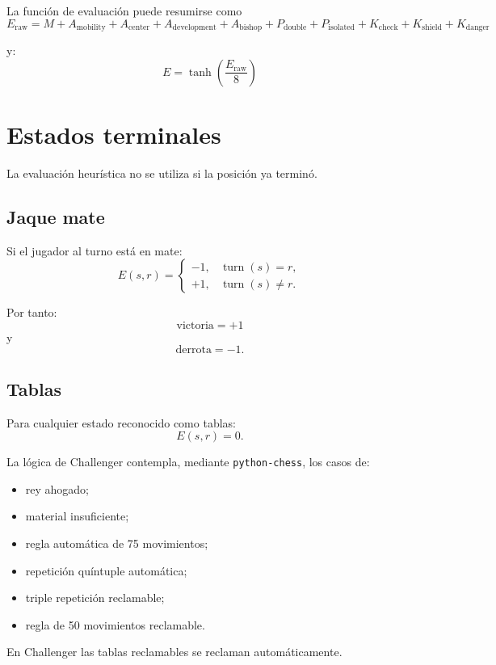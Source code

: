\documentclass[11pt,a4paper]{article}
\begin{document}
La función de evaluación puede resumirse como
\[
\boxed{
E_{\mathrm{raw}}
=
M
+
A_{\mathrm{mobility}}
+
A_{\mathrm{center}}
+
A_{\mathrm{development}}
+
A_{\mathrm{bishop}}
+
P_{\mathrm{double}}
+
P_{\mathrm{isolated}}
+
K_{\mathrm{check}}
+
K_{\mathrm{shield}}
+
K_{\mathrm{danger}}
}
\]

y:
\[
\boxed{
E=
\tanh\left(
\frac{E_{\mathrm{raw}}}{8}
\right)
}
\]

\section{Estados terminales}

La evaluación heurística no se utiliza si la posición ya terminó.

\subsection{Jaque mate}

Si el jugador al turno está en mate:
\[
E(s,r)=
\begin{cases}
-1, & \operatorname{turn}(s)=r,\\
+1, & \operatorname{turn}(s)\neq r.
\end{cases}
\]

Por tanto:
\[
\boxed{\text{victoria}=+1}
\]
y
\[
\boxed{\text{derrota}=-1}.
\]

\subsection{Tablas}

Para cualquier estado reconocido como tablas:
\[
\boxed{E(s,r)=0}.
\]

La lógica de Challenger contempla, mediante \texttt{python-chess}, los casos de:

\begin{itemize}
    \item rey ahogado;
    \item material insuficiente;
    \item regla automática de 75 movimientos;
    \item repetición quíntuple automática;
    \item triple repetición reclamable;
    \item regla de 50 movimientos reclamable.
\end{itemize}

En Challenger las tablas reclamables se reclaman automáticamente.
\end{document}
